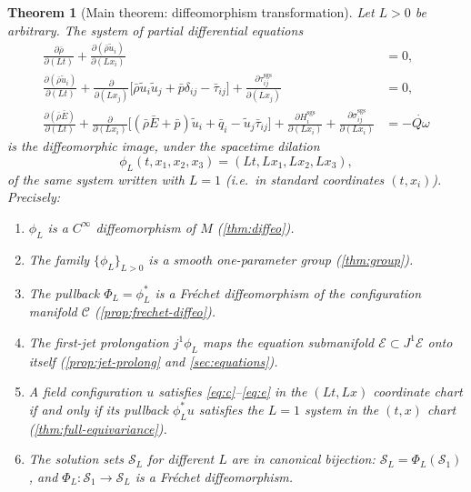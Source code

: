 \documentclass[11pt]{article}
\newtheorem{theorem}{Theorem}[section]
\theoremstyle{definition}
\theoremstyle{remark}
\newcommand{\E}{\mathcal{E}}
\newcommand{\sgs}{\mathrm{sgs}}
\newcommand{\barrho}{\bar{\rho}}
\newcommand{\barp}{\bar{p}}
\newcommand{\barE}{\bar{E}}
\newcommand{\bartau}{\bar{\tau}}
\newcommand{\barq}{\bar{q}}
\newcommand{\tilu}{\widetilde{u}}
\newcommand{\Qdot}{\dot{Q\omega}}
\begin{document}
\begin{theorem}[Main theorem: diffeomorphism transformation]
\label{thm:main}
Let $L>0$ be arbitrary.  The system of partial differential equations
\begin{align}
\frac{\partial\barrho}{\partial(Lt)}
+\frac{\partial(\barrho\tilu_i)}{\partial(Lx_i)}&=0,
\label{eq:c}\\
\frac{\partial(\barrho\tilu_i)}{\partial(Lt)}
+\frac{\partial}{\partial(Lx_j)}\bigl[\barrho\tilu_i\tilu_j+\barp\delta_{ij}
-\bartau_{ij}\bigr]
+\frac{\partial\tau^{\sgs}_{ij}}{\partial(Lx_j)}&=0,
\label{eq:m}\\
\frac{\partial(\barrho\barE)}{\partial(Lt)}
+\frac{\partial}{\partial(Lx_i)}\bigl[(\barrho\barE+\barp)\tilu_i
+\barq_i-\tilu_j\bartau_{ij}\bigr]
+\frac{\partial H^{\sgs}_i}{\partial(Lx_i)}
+\frac{\partial\sigma^{\sgs}_{ij}}{\partial(Lx_i)}
&=-\Qdot
\label{eq:e}
\end{align}
is the diffeomorphic image, under the spacetime dilation
\[
\phi_L(t,x_1,x_2,x_3)=(Lt,Lx_1,Lx_2,Lx_3),
\]
of the same system written with $L=1$ (i.e.\ in standard coordinates
$(t,x_i)$).  Precisely:
\begin{enumerate}
\item $\phi_L$ is a $C^\infty$ diffeomorphism of $M$ (\ref{thm:diffeo}).
\item The family $\{\phi_L\}_{L>0}$ is a smooth one-parameter group
      (\ref{thm:group}).
\item The pullback $\Phi_L=\phi_L^*$ is a Fr\'echet diffeomorphism of the
      configuration manifold $\mathcal C$ (\ref{prop:frechet-diffeo}).
\item The first-jet prolongation $j^1\phi_L$ maps the equation submanifold
      $\mathcal E\subset J^1\E$ onto itself (\ref{prop:jet-prolong} and
      \ref{sec:equations}).
\item A field configuration $u$ satisfies \eqref{eq:c}--\eqref{eq:e} in the
      $(Lt,Lx)$ coordinate chart if and only if its pullback
      $\phi_L^*u$ satisfies the $L=1$ system in the $(t,x)$ chart
      (\ref{thm:full-equivariance}).
\item The solution sets $\mathcal S_L$ for different $L$ are in canonical
      bijection: $\mathcal S_L=\Phi_L(\mathcal S_1)$, and
      $\Phi_L:\mathcal S_1\to\mathcal S_L$ is a Fr\'echet diffeomorphism.
\end{enumerate}
\end{theorem}
\end{document}
